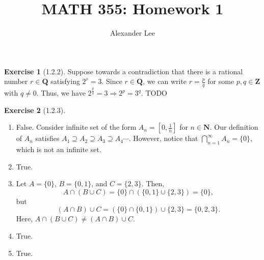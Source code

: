 \documentclass{amsart}
\title{MATH 355: Homework 1}
\author{Alexander Lee}
\theoremstyle{definition}
\newtheorem{exercise}{Exercise}
\newcommand{\N}{\mathbf{N}}
\newcommand{\Z}{\mathbf{Z}}
\newcommand{\Q}{\mathbf{Q}}
\begin{document}
\maketitle

\begin{exercise}[1.2.2]
  Suppose towards a contradiction that there is a rational number $r \in \Q$
  satisfying $2^r = 3$. Since $r \in \Q$, we can write $r = \frac{p}{q}$ for
  some $p, q \in \Z$ with $q \neq 0$. Thus, we have $2^\frac{p}{q} = 3
  \Rightarrow 2^p = 3^q$. TODO
\end{exercise}

\begin{exercise}[1.2.3]
  \begin{enumerate}[label={(\alph*)}]
    \item False. Consider infinite set of the form $A_n = [0, \frac{1}{n}]$ for
      $n \in \N$. Our definition of $A_n$ satisfies $A_1 \supseteq A_2 \supseteq
      A_3 \supseteq A_4 \cdots$. However, notice that $\bigcap_{n=1}^{\infty}
      A_n = \{0\}$, which is not an infinite set.
    \item True.
    \item Let $A = \{0\}$, $B = \{0, 1\}$, and $C = \{2, 3\}$. Then,
      \[
        A \cap (B \cup C) = \{0\} \cap (\{0, 1\} \cup \{2, 3\}) = \{0\},
      \]
      but
      \[
        (A \cap B) \cup C = (\{0\} \cap \{0, 1\}) \cup \{2, 3\} = \{0, 2, 3\}.
      \]
      Here, $A \cap (B \cup C) \neq (A \cap B) \cup C$.
    \item True.
    \item True.
  \end{enumerate}
\end{exercise}
\end{document}
